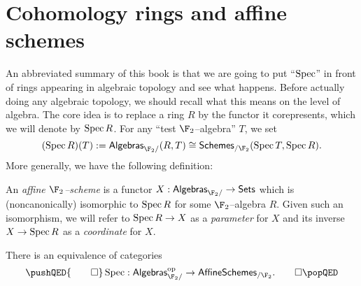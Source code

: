 \section{Cohomology rings and affine schemes}\label{SectionSchemesOverF2}

An abbreviated summary of this book is that we are going to put ``$\operatorname{Spec}$'' in front of rings appearing in algebraic topology and see what happens.  Before actually doing any algebraic topology, we should recall what this means on the level of algebra.  The core idea is to replace a ring $R$ by the functor it corepresents, which we will denote by $\operatorname{Spec} R$.  For any ``test $\F_2$--algebra'' $T$, we set \[(\Spec R)(T) := \CatOf{Algebras}_{\F_2/}(R, T) \cong \CatOf{Schemes}_{/\F_2}(\Spec T, \Spec R).\]  More generally, we have the following definition:
\begin{definition}\label{DefnAffineF2Scheme}
An \textit{affine $\F_2$--scheme} is a functor $X: \CatOf{Algebras}_{\F_2/} \to \CatOf{Sets}$ which is (noncanonically) isomorphic to $\operatorname{Spec} R$ for some $\F_2$--algebra $R$.  Given such an isomorphism, we will refer to $\operatorname{Spec} R \to X$ as a \textit{parameter} for $X$ and its inverse $X \to \operatorname{Spec} R$ as a \textit{coordinate} for $X$.
\end{definition}

\begin{lemma}
There is an equivalence of categories
\[
\pushQED{\qed}
\Spec: \CatOf{Algebras}_{\F_2/}^{\mathrm{op}} \to \CatOf{AffineSchemes}_{/\F_2}.\qedhere
\popQED
\]
\end{lemma}

